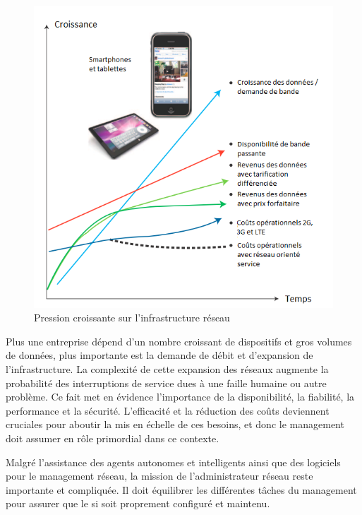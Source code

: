 \begin{figure}[!h] %
\includegraphics[width=15cm]{images/IncreasingPressureOnNetworkInfra2.png} %
\caption{ Pression croissante sur l'infrastructure réseau \cite{IBMManagingGrowingPainsNeed}} %
\label{imgPressure} %
\end{figure} %

Plus une entreprise dépend d'un nombre croissant de dispositifs et gros volumes de données, plus importante est la demande de débit et d'expansion de l'infrastructure. La complexité de cette expansion des réseaux augmente la probabilité des interruptions de service dues à une faille humaine ou autre problème. Ce fait met en évidence l'importance de la disponibilité, la fiabilité, la performance et la sécurité. L'efficacité et la réduction des coûts deviennent cruciales pour aboutir la mis en échelle de ces besoins, et donc le management doit assumer en rôle primordial dans ce contexte. \cite{IBMManagingGrowingPainsNeed}
 

Malgré l'assistance des agents autonomes et intelligents ainsi que des logiciels pour le management réseau, la mission de l'administrateur réseau reste importante et compliquée. Il doit équilibrer les différentes tâches du management pour assurer que le \gls{si} soit proprement configuré et maintenu. \cite{CentralIssuesNetworkManagementConclusion}

